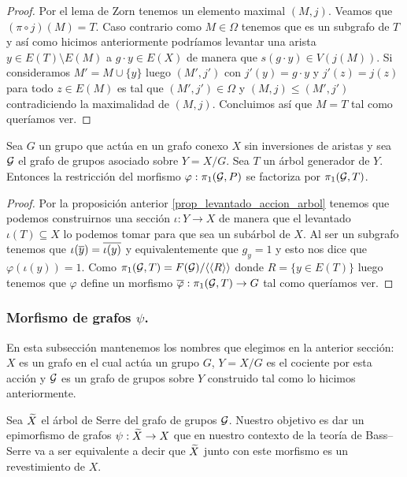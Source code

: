 \documentclass[tesis.tex]{subfiles}
\begin{document}
\begin{proof}
	
	Por el lema de Zorn tenemos un elemento maximal $(M,j)$.
	Veamos que $(\pi \circ j)(M) = T$.
	Caso contrario como $M \in \Omega$ tenemos que es un subgrafo de $T$ y así como hicimos anteriormente podríamos levantar una arista $y \in E(T) \setminus E(M)$ a $g\cdot y \in E(X)$ de manera que $s(g\cdot y ) \in V(j(M))$.
	Si consideramos $M' =M \cup \{y\}$ luego $(M', j')$ con $j'(y) = g \cdot y$ y $j'(z) = j(z)$ para todo $z \in E(M)$ es tal que $(M',j') \in \Omega$ y $(M,j) \le (M',j')$ contradiciendo la maximalidad de $(M,j)$.
	Concluimos así que $M = T$ tal como queríamos ver.	
\end{proof}


\begin{coro}
	Sea $G$ un grupo que actúa en un grafo conexo $X$ sin inversiones de aristas y sea ${\cal G}$ el grafo de grupos asociado sobre $Y = X / G$.
	Sea $T$ un árbol generador de $Y$.
	Entonces la restricción del morfismo $\varphi: \pi_1({\cal G}, P)$ se factoriza por $\pi_1({\cal G}, T)$.
\end{coro}
\begin{proof}
	Por la proposición anterior \ref{prop_levantado_accion_arbol} tenemos que
	podemos construirnos una sección $\iota:Y \to X$ de manera que el levantado $\iota(T) \subseteq X$ lo podemos tomar para que sea un subárbol de $X$.
	Al ser un subgrafo tenemos que $\iota(\overline y) = \overline {\iota (y)}$ y equivalentemente que $g_{y}=1$ y esto nos dice que $\varphi(\iota(y)) = 1$.
	Como $\pi_1({\cal G},T) = F({\cal G}) / \langle \langle R \rangle \rangle$ donde $R = \{ y \in E(T) \}$ luego tenemos que $\varphi$ define un morfismo $\overline \varphi: \pi_1({\cal G}, T) \to G$ tal como queríamos ver.
\end{proof}

\subsubsection{Morfismo de grafos $\psi$.}

En esta subsección mantenemos los nombres que elegimos en la anterior sección: $X$ es un grafo en el cual actúa un grupo $G$, $Y = X/G$ es el cociente por esta acción y ${\cal G}$ es un grafo de grupos sobre $Y$ construido tal como lo hicimos anteriormente.

Sea $\widetilde X$ el árbol de Serre del grafo de grupos ${\cal G}$.
Nuestro objetivo es dar un epimorfismo de grafos $\psi:\widetilde X \to X$ que en nuestro contexto de la teoría de Bass--Serre va a ser equivalente a decir que $\widetilde X$ junto con este morfismo es un revestimiento de $X$.
\end{document}
